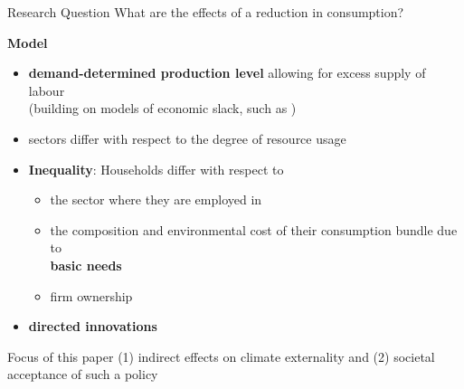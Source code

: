 \documentclass[11pt,aspectratio=169]{beamer}
\begin{document}
\begin{frame}{}
	\vspace{4mm}
		\begin{block}{Research Question}
			What are the effects of a reduction in consumption?%
	\end{block}
%
\pause
\textbf{Model}
\pause
\vspace{-2mm}
	\begin{itemize}[<+-| alert@+>]
		\item \textbf{demand-determined production level} allowing for excess supply of labour \\
		\small{(building on models of economic slack, such as \cite{Auerbach2021InequalityEconomy})}
		
		\item sectors differ with respect to the degree of resource usage %
		\item \textbf{Inequality}: Households differ with respect to
		\begin{itemize}
	
\item the sector where they are employed in
\item the composition and environmental cost of their consumption bundle due to\\ \textbf{basic needs} 
\item firm ownership
		\end{itemize}
	\item \textbf{directed innovations}
	\end{itemize}
\vspace{2mm}
\pause 
\begin{block}{Focus of this paper}
(1) indirect effects on climate externality  and (2) societal acceptance of such a policy
\end{block}
\end{frame}
\end{document}
